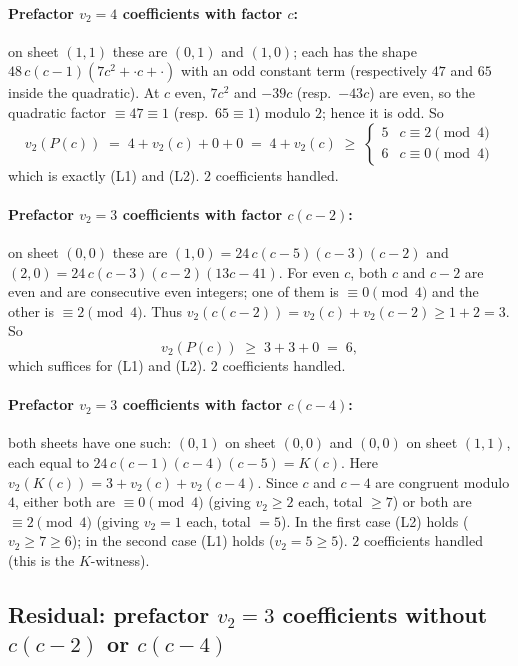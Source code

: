 \documentclass[11pt]{article}
\begin{document}
\paragraph{Prefactor $v_2 = 4$ coefficients with factor $c$:} on sheet $(1,1)$
these are $(0,1)$ and $(1,0)$; each has the shape $48\,c(c-1)(7c^2 + \cdot c + \cdot)$ with an
odd constant term (respectively $47$ and $65$ inside the quadratic). At $c$ even,
$7c^2$ and $-39c$ (resp.\ $-43c$) are even, so the quadratic factor $\equiv 47 \equiv 1$
(resp.\ $65 \equiv 1$) modulo $2$; hence it is odd. So
\[
  v_2(P(c)) \;=\; 4 + v_2(c) + 0 + 0 \;=\; 4 + v_2(c) \;\ge\; \begin{cases} 5 & c \equiv 2 \pmod 4 \\ 6 & c \equiv 0 \pmod 4 \end{cases}
\]
which is exactly (L1) and (L2). $2$ coefficients handled.

\paragraph{Prefactor $v_2 = 3$ coefficients with factor $c(c-2)$:} on sheet $(0,0)$
these are $(1,0) = 24\,c(c-5)(c-3)(c-2)$ and $(2,0) = 24\,c(c-3)(c-2)(13c-41)$.
For even $c$, both $c$ and $c-2$ are even and are consecutive even integers; one of them
is $\equiv 0 \pmod 4$ and the other is $\equiv 2 \pmod 4$. Thus
$v_2(c(c-2)) = v_2(c) + v_2(c-2) \ge 1 + 2 = 3$. So
\[
  v_2(P(c)) \;\ge\; 3 + 3 + 0 \;=\; 6,
\]
which suffices for (L1) and (L2). $2$ coefficients handled.

\paragraph{Prefactor $v_2 = 3$ coefficients with factor $c(c-4)$:} both sheets have
one such: $(0,1)$ on sheet $(0,0)$ and $(0,0)$ on sheet $(1,1)$, each equal to
$24\,c(c-1)(c-4)(c-5) = K(c)$. Here $v_2(K(c)) = 3 + v_2(c) + v_2(c-4)$.
Since $c$ and $c-4$ are congruent modulo $4$, either both are $\equiv 0 \pmod 4$ (giving
$v_2 \ge 2$ each, total $\ge 7$) or both are $\equiv 2 \pmod 4$ (giving $v_2 = 1$ each,
total $= 5$). In the first case (L2) holds ($v_2 \ge 7 \ge 6$); in the second case (L1) holds
($v_2 = 5 \ge 5$). $2$ coefficients handled (this is the $K$-witness).

\subsection{Residual: prefactor $v_2 = 3$ coefficients without $c(c-2)$ or $c(c-4)$}
\end{document}
